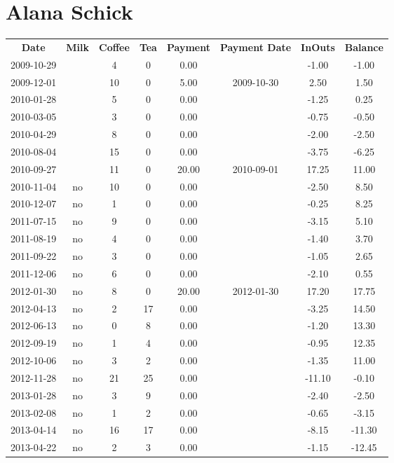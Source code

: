 \section{Alana Schick}

\begin{center}
\begin{tabular}{cccccccc}
\textbf{Date} & \textbf{Milk} & \textbf{Coffee} & \textbf{Tea} & \textbf{Payment} & \textbf{Payment Date} & \textbf{InOuts} & \textbf{Balance} \\
2009-10-29 &  &  4 &  0 &  0.00 &  &  -1.00 &  -1.00\\ 
2009-12-01 &  & 10 &  0 &  5.00 & 2009-10-30 &   2.50 &   1.50\\ 
2010-01-28 &  &  5 &  0 &  0.00 &  &  -1.25 &   0.25\\ 
2010-03-05 &  &  3 &  0 &  0.00 &  &  -0.75 &  -0.50\\ 
2010-04-29 &  &  8 &  0 &  0.00 &  &  -2.00 &  -2.50\\ 
2010-08-04 &  & 15 &  0 &  0.00 &  &  -3.75 &  -6.25\\ 
2010-09-27 &  & 11 &  0 & 20.00 & 2010-09-01 &  17.25 &  11.00\\ 
2010-11-04 & no & 10 &  0 &  0.00 &  &  -2.50 &   8.50\\ 
2010-12-07 & no &  1 &  0 &  0.00 &  &  -0.25 &   8.25\\ 
2011-07-15 & no &  9 &  0 &  0.00 &  &  -3.15 &   5.10\\ 
2011-08-19 & no &  4 &  0 &  0.00 &  &  -1.40 &   3.70\\ 
2011-09-22 & no &  3 &  0 &  0.00 &  &  -1.05 &   2.65\\ 
2011-12-06 & no &  6 &  0 &  0.00 &  &  -2.10 &   0.55\\ 
2012-01-30 & no &  8 &  0 & 20.00 & 2012-01-30 &  17.20 &  17.75\\ 
2012-04-13 & no &  2 & 17 &  0.00 &  &  -3.25 &  14.50\\ 
2012-06-13 & no &  0 &  8 &  0.00 &  &  -1.20 &  13.30\\ 
2012-09-19 & no &  1 &  4 &  0.00 &  &  -0.95 &  12.35\\ 
2012-10-06 & no &  3 &  2 &  0.00 &  &  -1.35 &  11.00\\ 
2012-11-28 & no & 21 & 25 &  0.00 &  & -11.10 &  -0.10\\ 
2013-01-28 & no &  3 &  9 &  0.00 &  &  -2.40 &  -2.50\\ 
2013-02-08 & no &  1 &  2 &  0.00 &  &  -0.65 &  -3.15\\ 
2013-04-14 & no & 16 & 17 &  0.00 &  &  -8.15 & -11.30\\ 
2013-04-22 & no &  2 &  3 &  0.00 &  &  -1.15 & -12.45
\end{tabular}
\end{center}


